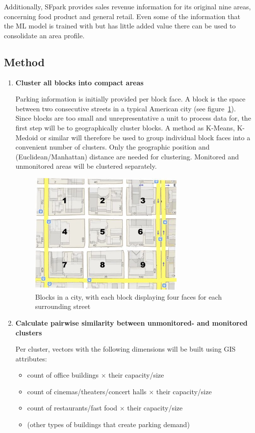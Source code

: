 \documentclass{article}
\begin{document}
\begin{large}
Additionally, SFpark provides sales revenue information for its original nine areas, concerning food product and general retail. Even some of the information that the ML model is trained with but has little added value there can be used to consolidate an area profile. 

\subsection{Method} 
\begin{enumerate}
\item \textbf{Cluster all blocks into compact areas}

Parking information is initially provided per block face. A block is the space between two consecutive streets in a typical American city (see figure~\ref{fig:block_faces}). Since blocks are too small and unrepresentative a unit to process data for, the first step will be to geographically cluster blocks.
A method as K-Means, K-Medoid or similar will therefore be used to group individual block faces into a convenient number of clusters. Only the geographic position and (Euclidean/Manhattan) distance are needed for clustering. Monitored and unmonitored areas will be clustered separately.

\begin{figure}[!ht]
    \centering
    \includegraphics[width=3.0in]{blocks.jpg}
    \caption{Blocks in a city, with each block displaying four faces for each surrounding street\cite{blocks_source}}
    \label{fig:block_faces}
\end{figure}

\item \textbf{Calculate pairwise similarity between unmonitored- and monitored clusters}

Per cluster, vectors with the following dimensions will be built using GIS attributes:
\begin{itemize}
\item count of office buildings $\times$ their capacity/size
\item count of cinemas/theaters/concert halls $\times$ their capacity/size
\item count of restaurants/fast food $\times$ their capacity/size
\item (other types of buildings that create parking demand)
\end{itemize}


\end{enumerate}
\end{large}
\end{document}
